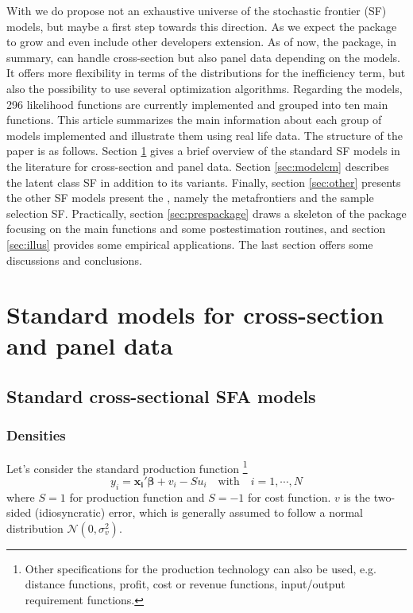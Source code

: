 \documentclass[nojss]{jss}
\begin{document}
With  we do propose not an exhaustive universe of the 
stochastic frontier (SF) models, but maybe a first step towards this direction. 
As we expect the package to grow and even include other developers extension. As of
now, the package, in summary, can handle cross-section but also panel data depending on the 
models. It offers more flexibility in terms of the distributions for the 
inefficiency term, but also the possibility to use several optimization 
algorithms. Regarding the models, 296 likelihood functions are currently 
implemented and grouped into ten main functions. This article summarizes the main information 
about each group of models implemented and illustrate them using real life data.
The structure of the paper is as follows. Section \ref{sec:modelstandar} gives 
a brief overview of the standard SF models in the literature for cross-section
and panel data. Section \ref{sec:modelcm} describes the latent class SF in
addition to its variants. Finally, section \ref{sec:other} presents the other 
SF models present the , namely the metafrontiers and the sample 
selection SF. Practically, section \ref{sec:prespackage} draws a skeleton
of the  package focusing on the main functions and some postestimation
routines, and section \ref{sec:illus} provides some empirical applications. The
last section offers some discussions and conclusions.

\section{Standard models for cross-section and panel data} \label{sec:modelstandar}

\subsection{Standard cross-sectional SFA models}

\subsubsection{Densities}

Let's consider the standard production function \footnote{Other specifications 
for the production technology can also be used, e.g. distance functions, profit,
cost or revenue functions, input/output requirement functions.} 
%
\begin{equation}\label{eq:1}
y_i = \mathbf{x_i'}\bm{\beta} + v_i - Su_i \quad \text{with} \quad i = 1, \cdots, N
\end{equation}
%
where $S = 1$ for production function and $S = -1$ for cost function. $v$ is the 
two-sided (idiosyncratic) error, which is generally assumed to follow a normal distribution 
$\mathcal{N}(0, \sigma_v^2)$. 
\end{document}
